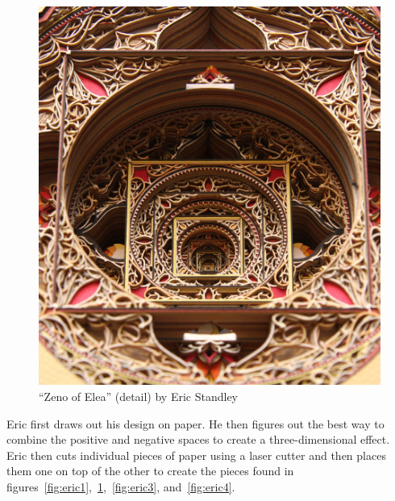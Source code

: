 \documentclass[12pt singlecol]{article}
\begin{document}
\begin{flushleft}
\begin{figure}
  \centering  
  \includegraphics[width=\linewidth]{eric2}
  \caption{``Zeno of Elea'' (detail) by Eric Standley \cite{standley}}
  \label{fig:eric2}
\end{figure}	

Eric first draws out his design on paper. He then figures out the best way to combine the positive and negative spaces to create a three-dimensional effect. Eric then cuts individual pieces of paper using a laser cutter and then places them one on top of the other to create the pieces found in figures~\ref{fig:eric1},~\ref{fig:eric2},~\ref{fig:eric3}, and~\ref{fig:eric4}. \cite{standley, david13}


\end{flushleft}
\end{document}

